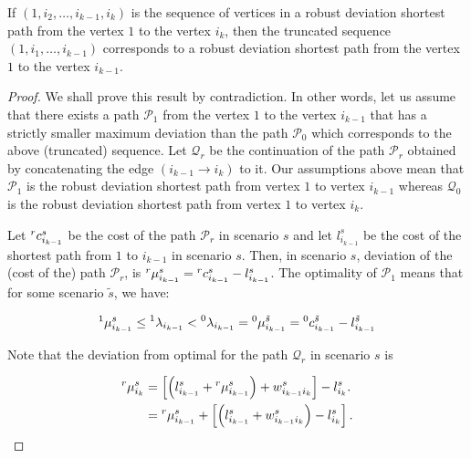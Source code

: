 \begin{lemma} If $(1,i_2,\dots,i_{k-1},i_k)$ is the sequence of vertices in a robust deviation shortest path from the vertex $1$ to the vertex $i_k$, then the truncated sequence $(1,i_1,\dots,i_{k-1})$ corresponds to a robust deviation shortest path from the vertex $1$ to the vertex $i_{k-1}$.
\end{lemma}
\begin{proof} We shall prove this result by contradiction. In other words, let us assume that there exists a path $\mathcal{P}_1$ from the vertex $1$ to the vertex $i_{k-1}$ that has a strictly smaller maximum deviation than the path $\mathcal{P}_0$ which corresponds to the above (truncated) sequence. Let $\mathcal{Q}_r$ be the continuation of the path $\mathcal{P}_r$ obtained by concatenating the edge $(i_{k-1} \rightarrow i_k)$ to it. Our assumptions above mean that $\mathcal{P}_1$ is the robust deviation shortest path from vertex $1$ to vertex $i_{k-1}$ whereas $\mathcal{Q}_0$ is the robust deviation shortest path from vertex $1$ to vertex $i_{k}$.

Let $\prescript{r}{}{c}^{s}_{i_{k-1}}$ be the cost of the path $\mathcal{P}_r$ in scenario $s$ and let ${l}^{s}_{i_{k-1}}$ be the cost of the shortest path from $1$ to $i_{k-1}$ in scenario $s$. Then, in scenario $s$, deviation of the (cost of the) path $\mathcal{P}_r$, is $\prescript{r}{}{\mu}^{s}_{i_{k-1}} = \prescript{r}{}{c}^{s}_{i_{k-1}} - {l}^{s}_{i_{k-1}}$. The optimality of $\mathcal{P}_1$ means that for some scenario $\tilde{s}$, we have:

\begin{equation*}
\prescript{1}{}{\mu}^{s}_{i_{k-1}} \le \prescript{1}{}{\lambda}_{i_{k-1}} < \prescript{0}{}{\lambda}_{i_{k-1}} = \prescript{0}{}{\mu}^{\tilde{s}}_{i_{k-1}} = \prescript{0}{}{c}^{\tilde{s}}_{i_{k-1}} - {l}^{\tilde{s}}_{i_{k-1}}
\end{equation*}

Note that the deviation from optimal for the path $\mathcal{Q}_r$ in scenario $s$ is

\begin{align*}
\prescript{r}{}{\mu}^{s}_{i_{k}} &= \left[\left({l}^{s}_{i_{k-1}} + \prescript{r}{}{\mu}^{s}_{i_{k-1}}\right) + w^s_{i_{k-1}i_{k}}\right] - {l}^{s}_{i_{k}}.\\
 &= \prescript{r}{}{\mu}^{s}_{i_{k-1}} + \left[\left({l}^{s}_{i_{k-1}} + w^s_{i_{k-1}i_{k}}\right) - {l}^{s}_{i_{k}}\right].
\end{align*}


\end{proof}
